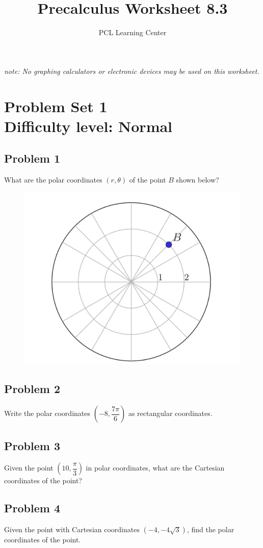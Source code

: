 \documentclass[12pt]{article}
\title{Precalculus Worksheet 8.3}
\author{PCL Learning Center}
\date{}
\begin{document}
\maketitle

\begin{center}
    \textit{note: No graphing calculators or electronic devices may be used on this worksheet.}    
\end{center}

\section*{Problem Set 1\\Difficulty level: Normal}
\subsection*{Problem 1}
What are the polar coordinates \((r,\theta)\) of the point \(B\) shown below?

\begin{figure}[!ht]
    \centering
    \includegraphics[width=0.5\linewidth]{polar_point_1.png}
\end{figure}

\subsection*{Problem 2}
Write the polar coordinates \((-8,\dfrac{7\pi}{6})\) as rectangular coordinates.

\subsection*{Problem 3}
Given the point \((10,\dfrac{\pi}{3})\) in polar coordinates, what are the Cartesian coordinates of the point?

\subsection*{Problem 4}
Given the point with Cartesian coordinates \((-4,-4\sqrt{3})\), find the polar coordinates of the point.
\end{document}

